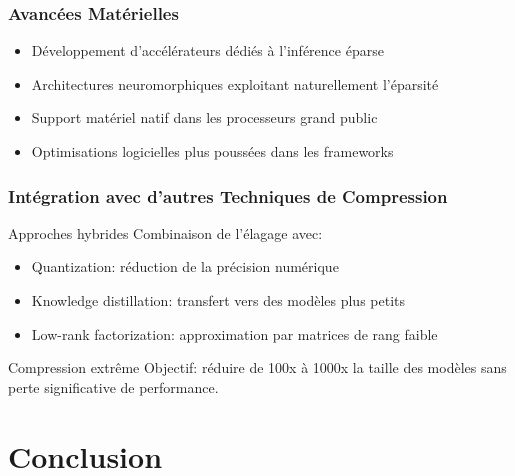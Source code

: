 \documentclass[10pt]{beamer}
\begin{document}
\begin{frame}
\frametitle{Avancées Matérielles}
\begin{itemize}
    \item Développement d'accélérateurs dédiés à l'inférence éparse
    \item Architectures neuromorphiques exploitant naturellement l'éparsité
    \item Support matériel natif dans les processeurs grand public
    \item Optimisations logicielles plus poussées dans les frameworks
\end{itemize}

\begin{center}
\end{center}
\end{frame}

\begin{frame}
\frametitle{Intégration avec d'autres Techniques de Compression}
\begin{block}{Approches hybrides}
Combinaison de l'élagage avec:
\begin{itemize}
    \item Quantization: réduction de la précision numérique
    \item Knowledge distillation: transfert vers des modèles plus petits
    \item Low-rank factorization: approximation par matrices de rang faible
\end{itemize}
\end{block}

\begin{exampleblock}{Compression extrême}
Objectif: réduire de 100x à 1000x la taille des modèles sans perte significative de performance.
\end{exampleblock}
\end{frame}

\section{Conclusion}
\end{document}
